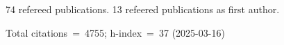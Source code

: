 74 refereed publications. 13 refeered publications as first author.

Total citations~=~4755; h-index~=~37 (2025-03-16)
